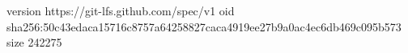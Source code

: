 version https://git-lfs.github.com/spec/v1
oid sha256:50c43edaca15716c8757a64258827caca4919ee27b9a0ac4ec6db469c095b573
size 242275
